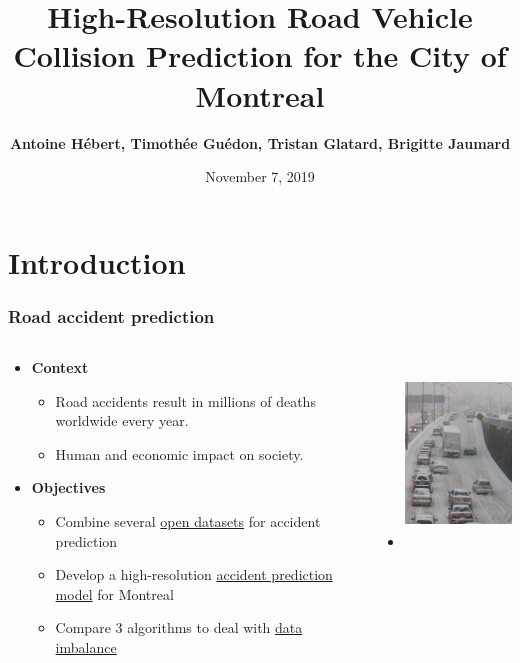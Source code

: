 \documentclass[slidestop,compress,red,mathserif]{beamer}
\title[My Title]{High-Resolution Road Vehicle Collision Prediction
for the City of Montreal}
\author[My~Name]{\small
\textbf{Antoine H\'ebert, Timoth\'ee Gu\'edon, Tristan Glatard, Brigitte Jaumard}}
\institute[My Institute/company]
{Concordia University \\ Department of Computer Science and Software Engineering}
\date[]{November 7, 2019}
\begin{document}
\begin{frame} %
\titlepage
\end{frame}

\section{Introduction}


\begin{frame}
\frametitle{Road accident prediction}

  \begin{columns}
    \begin{column}{0.6\textwidth}
\begin{itemize}
\item[] \textbf{Context}
  \begin{itemize}
    \item Road accidents result in millions of deaths worldwide every year.
		\item Human and economic impact on society.
  \end{itemize}

\item[] \textbf{Objectives}
  \begin{itemize}
    \item Combine several \underline{open datasets} for accident prediction
    \item Develop a high-resolution \underline{accident prediction model} for Montreal
    \item Compare 3 algorithms to deal with \underline{data imbalance}
  \end{itemize}
\end{itemize}
\end{column}
\begin{column}{0.4\textwidth}
  \begin{itemize}
\item[] \includegraphics[height=5cm]{Figures/snow.png}
  \end{itemize} 
\end{column}
\end{columns}
\end{frame}
\end{document}
